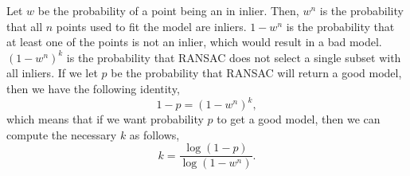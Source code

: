 Let $w$ be the probability of a point being an in inlier. Then, $w^n$ is the
probability that all $n$ points used to fit the model are inliers. $1-w^n$ is
the probability that at least one of the points is not an inlier, which would
result in a bad model. $(1-w^n)^k$ is the probability that RANSAC does not
select a single subset with all inliers. If we let $p$ be the probability that
RANSAC will return a good model, then we have the following identity, \[
    1-p = (1-w^n)^k,
\]
which means that if we want probability $p$ to get a good model, then we can
compute the necessary $k$ as follows, \[
    k = \frac{\log(1-p)}{\log(1-w^n)}.
\]
